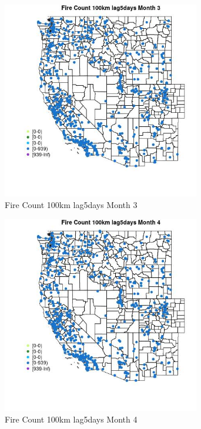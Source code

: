 \begin{figure} 
\centering  
\includegraphics[width=0.77\textwidth]{Code_Outputs/Report_ML_input_PM25_Step4_part_e_de_duplicated_aves_compiled_2019-05-21wNAs_MapObsMo3Fire_Count_100km_lag5days.jpg} 
\caption{\label{fig:Report_ML_input_PM25_Step4_part_e_de_duplicated_aves_compiled_2019-05-21wNAsMapObsMo3Fire_Count_100km_lag5days}Fire Count 100km lag5days Month 3} 
\end{figure} 
 

\clearpage 

\begin{figure} 
\centering  
\includegraphics[width=0.77\textwidth]{Code_Outputs/Report_ML_input_PM25_Step4_part_e_de_duplicated_aves_compiled_2019-05-21wNAs_MapObsMo4Fire_Count_100km_lag5days.jpg} 
\caption{\label{fig:Report_ML_input_PM25_Step4_part_e_de_duplicated_aves_compiled_2019-05-21wNAsMapObsMo4Fire_Count_100km_lag5days}Fire Count 100km lag5days Month 4} 
\end{figure} 
 

